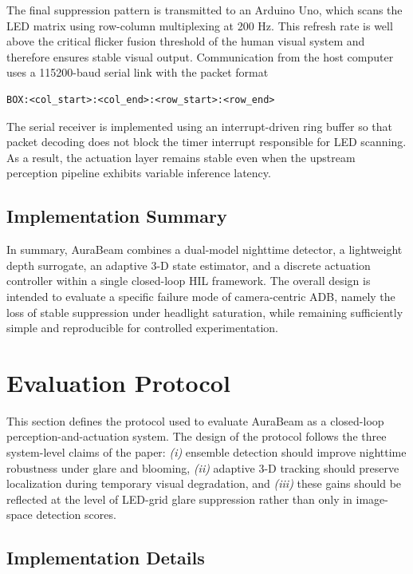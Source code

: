 \documentclass[pdflatex,sn-mathphys-num]{sn-jnl}%
\theoremstyle{thmstyleone}%
\theoremstyle{thmstyletwo}%
\theoremstyle{thmstylethree}%
\begin{document}
The final suppression pattern is transmitted to an Arduino Uno, which scans the LED matrix using row-column multiplexing at 200 Hz. This refresh rate is well above the critical flicker fusion threshold of the human visual system and therefore ensures stable visual output. Communication from the host computer uses a 115200-baud serial link with the packet format

\begin{verbatim}
BOX:<col_start>:<col_end>:<row_start>:<row_end>
\end{verbatim}

The serial receiver is implemented using an interrupt-driven ring buffer so that packet decoding does not block the timer interrupt responsible for LED scanning. As a result, the actuation layer remains stable even when the upstream perception pipeline exhibits variable inference latency.

\subsection{Implementation Summary}
\label{subsec:implementation_summary}

In summary, AuraBeam combines a dual-model nighttime detector, a lightweight depth surrogate, an adaptive 3-D state estimator, and a discrete actuation controller within a single closed-loop HIL framework. The overall design is intended to evaluate a specific failure mode of camera-centric ADB, namely the loss of stable suppression under headlight saturation, while remaining sufficiently simple and reproducible for controlled experimentation.

\section{Evaluation Protocol}
\label{sec:eval}
This section defines the protocol used to evaluate AuraBeam as a
closed-loop perception-and-actuation system. The design of the protocol
follows the three system-level claims of the paper: \emph{(i)}
ensemble detection should improve nighttime robustness under glare and
blooming, \emph{(ii)} adaptive 3-D tracking should preserve
localization during temporary visual degradation, and \emph{(iii)}
these gains should be reflected at the level of LED-grid glare
suppression rather than only in image-space detection scores.

\subsection{Implementation Details}
\label{subsec:eval_impl}
\end{document}
